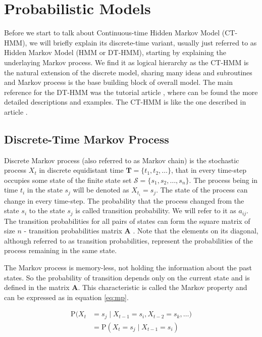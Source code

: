 \documentclass[thesis=M,english]{FITthesis}[2012/10/20]
\newcommand{\matr}[1]{\mathbf{#1}}
\begin{document}

\chapter{Probabilistic Models}

Before we start to talk about Continuous-time Hidden Markov Model (CT-HMM), we will briefly explain its discrete-time variant, usually just referred to as Hidden Markov Model (HMM or DT-HMM), starting by explaining the underlaying Markov process. We find it as logical hierarchy as the CT-HMM is the natural extension of the discrete model, sharing many ideas and subroutines and Markov process is the base building block of overall model. The main reference for the DT-HMM was the tutorial article \cite{Ra89}, where can be found the more detailed descriptions and examples. The CT-HMM is like the one described in article \cite{Li15}.

\section{Discrete-Time Markov Process}\label{sec:DMP}
    
Discrete Markov process (also referred to as Markov chain) is the stochastic process $X_t$ in discrete equidistant time $\matr{T} = \{ t_1,t_2,\dots \}$, that in every time-step occupies some state of the finite state set $\mathcal{S} = \{ s_1, s_2, \dots, s_n\}$. The process being in time $t_i$ in the state $s_j$ will be denoted as $X_{t_i} = s_j$. The state of the process can change in every time-step. The probability that the process changed from the state $s_i$ to the state $s_j$ is called transition probability. We will refer to it as $a_{ij}$. The transition probabilities for all pairs of states can form the square matrix of size $n$ - transition probabilities matrix $\matr{A}$ . Note that the elements on its diagonal, although referred to as transition probabilities, represent the probabilities of the process remaining in the same state.

The Markov process is memory-less, not holding the information about the past states. So the probability of transition depends only on the current state and is defined in the matrix $\matr{A}$. This characteristic is called the Markov property and can be expressed as in equation \eqref{eq:mp}.

\begin{equation}\label{eq:mp}
\begin{aligned}
\mathrm{P}(X_t & = s_j \mid X_{t-1} = s_i, X_{t-2} = s_k, \dots)  \\   
               & = \mathrm{P}(X_t = s_j \mid X_{t-1} = s_i )
\end{aligned}
\end{equation}
\end{document}

